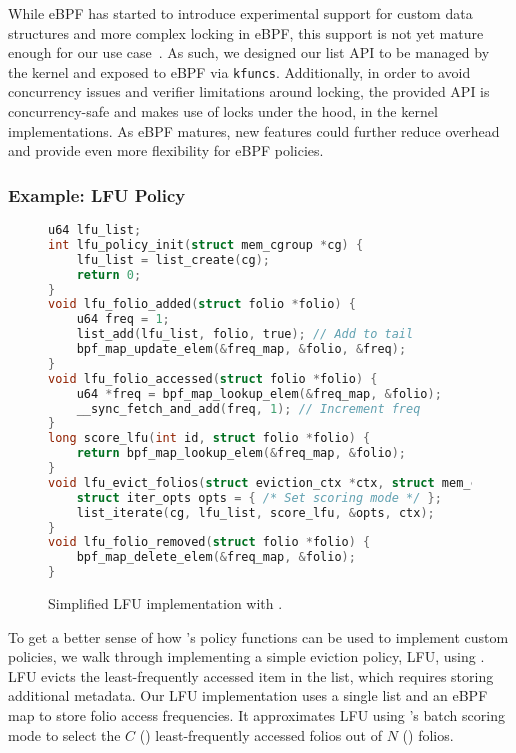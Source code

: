 While eBPF has started to introduce experimental support for custom data structures and more complex locking in eBPF, this support is not yet mature enough for our use case~\cite{kflex,bpf-arena,red-black-tree-bpf}. As such, we designed our list API to be managed by the kernel and exposed to eBPF via \texttt{kfuncs}. Additionally, in order to avoid concurrency issues and verifier limitations around locking, the provided API is concurrency-safe and makes use of locks under the hood, in the kernel implementations. As eBPF matures, new features could further reduce overhead and provide even more flexibility for eBPF policies.


\subsubsection{Example: LFU Policy}
\label{subsubsec:design_mru_example}



\begin{figure}
\begin{lstlisting}[language=C,basicstyle=\ttfamily\small]
u64 lfu_list;
int lfu_policy_init(struct mem_cgroup *cg) {
    lfu_list = list_create(cg);
    return 0;
}
void lfu_folio_added(struct folio *folio) {
    u64 freq = 1;
    list_add(lfu_list, folio, true); // Add to tail
    bpf_map_update_elem(&freq_map, &folio, &freq);
}
void lfu_folio_accessed(struct folio *folio) {
    u64 *freq = bpf_map_lookup_elem(&freq_map, &folio);
    __sync_fetch_and_add(freq, 1); // Increment freq
}
long score_lfu(int id, struct folio *folio) {
    return bpf_map_lookup_elem(&freq_map, &folio);
}
void lfu_evict_folios(struct eviction_ctx *ctx, struct mem_cgroup *cg) {
    struct iter_opts opts = { /* Set scoring mode */ };
    list_iterate(cg, lfu_list, score_lfu, &opts, ctx);
}
void lfu_folio_removed(struct folio *folio) {
    bpf_map_delete_elem(&freq_map, &folio);
}
\end{lstlisting}
\caption{Simplified LFU implementation with \name.}
\label{figure:example-lfu}
\end{figure}

To get a better sense of how \name's policy functions can be used to implement custom policies, we walk through implementing a simple eviction policy, LFU, using \name. LFU evicts the least-frequently accessed item in the list, which requires storing additional metadata. Our LFU implementation uses a single list and an eBPF map to store folio access frequencies. It approximates LFU using \name's batch scoring mode to select the $C$ () least-frequently accessed folios out of $N$ () folios.

